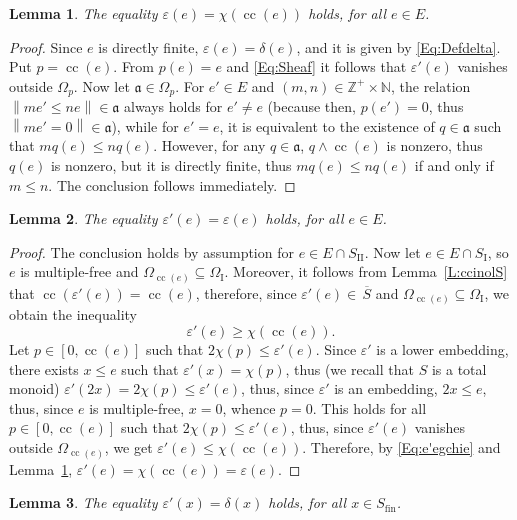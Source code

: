 \documentclass[psamsfonts,reqno]{memo-l}
\theoremstyle{plain}
\newtheorem{lemma}{Lemma}[section]
\theoremstyle{definition}
\theoremstyle{remark}
\numberwithin{equation}{section}
\newcommand{\eps}{\varepsilon}
\renewcommand{\iff}{if and only if}
\newcommand{\ol}[1]{\,\overline{\!#1}}
\newcommand{\fa}{\mathfrak{a}}
\newcommand{\fin}{\mathrm{fin}}
\newcommand{\bv}[1]{\left\|#1\right\|}
\newcommand{\I}{\mathrm{I}}
\newcommand{\II}{\mathrm{II}}
\newcommand{\NN}{\mathbb{N}}
\newcommand{\ZZ}{\mathbb{Z}}
\DeclareMathOperator{\cc}{cc}
\begin{document}
\begin{lemma}\label{L:epsonE}
The equality $\eps(e)=\chi(\cc(e))$ holds, for all $e\in E$.
\end{lemma}

\begin{proof}
Since $e$ is directly finite, $\eps(e)=\delta(e)$,
and it is given by
\eqref{Eq:Defdelta}. Put $p=\cc(e)$. {}From $p(e)=e$ and \eqref{Eq:Sheaf} it
follows that $\eps'(e)$ vanishes outside $\Omega_p$. Now let
$\fa\in\Omega_p$. For $e'\in E$ and $(m,n)\in\ZZ^+\times\NN$, the relation
$\bv{me'\leq ne}\in\fa$ always holds for $e'\neq e$ (because then, $p(e')=0$,
thus $\bv{me'=0}\in\fa$), while for $e'=e$, it is equivalent to the existence
of $q\in\fa$ such that $mq(e)\leq nq(e)$. However, for any $q\in\fa$,
$q\wedge\cc(e)$ is nonzero, thus $q(e)$ is nonzero, but it is
 directly finite, thus $mq(e)\leq nq(e)$ \iff\
$m\leq n$. The conclusion follows immediately.
\end{proof}

\begin{lemma}\label{L:eps'onI}
The equality $\eps'(e)=\eps(e)$ holds, for all $e\in E$.
\end{lemma}

\begin{proof}
The conclusion holds by assumption for $e\in E\cap S_\II$. Now let
$e\in E\cap S_\I$, so $e$ is multiple-free and
$\Omega_{\cc(e)}\subseteq\Omega_\I$. Moreover, it follows from
Lemma~\ref{L:ccinolS} that $\cc(\eps'(e))=\cc(e)$, therefore, since
$\eps'(e)\in\ol{S}$ and $\Omega_{\cc(e)}\subseteq\Omega_\I$, we obtain the
inequality
   \begin{equation}\label{Eq:e'egchie}
   \eps'(e)\geq\chi(\cc(e)).
   \end{equation}
Let $p\in[0,\cc(e)]$ such that $2\chi(p)\leq\eps'(e)$. Since $\eps'$
is a lower embedding,\index{lower embedding} there exists $x\leq e$ such that
$\eps'(x)=\chi(p)$, thus (we recall that $S$ is a total monoid)
$\eps'(2x)=2\chi(p)\leq\eps'(e)$, thus, since $\eps'$ is an
embedding, $2x\leq e$, thus, since $e$ is multiple-free, $x=0$, whence $p=0$.
This holds for all $p\in[0,\cc(e)]$ such that $2\chi(p)\leq\eps'(e)$,
thus, since $\eps'(e)$ vanishes outside $\Omega_{\cc(e)}$, we get
$\eps'(e)\leq\chi(\cc(e))$. Therefore, by \eqref{Eq:e'egchie} and
Lemma~\ref{L:epsonE}, $\eps'(e)=\chi(\cc(e))=\eps(e)$.
\end{proof}

\begin{lemma}\label{L:eps'delta}
The equality $\eps'(x)=\delta(x)$ holds, for all $x\in S_\fin$.
\end{lemma}
\end{document}
